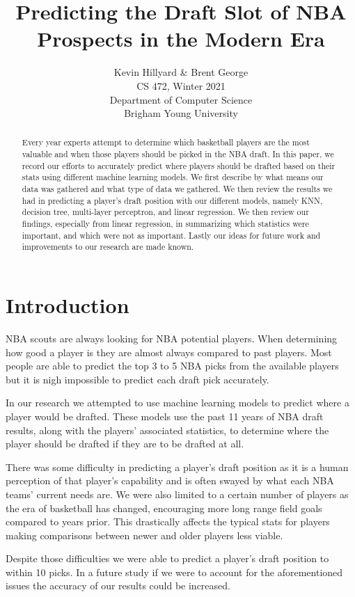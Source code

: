 \documentclass{article}
\title{Predicting the Draft Slot of NBA Prospects in the Modern Era}
\author{Kevin Hillyard \& Brent George \\
CS 472, Winter 2021 \\
Department of Computer Science\\
Brigham Young University}
\begin{document}
\maketitle

\begin{abstract}
  Every year experts attempt to determine which basketball players are the most
  valuable and when those players should be picked in the NBA draft. In this
  paper, we record our efforts to accurately predict where players should be
  drafted based on their stats using different machine learning models. We first
  describe by what means our data was gathered and what type of data we
  gathered. We then review the results we had in predicting a player’s draft
  position with our different models, namely KNN, decision tree, multi-layer
  perceptron, and linear regression. We then review our findings, especially
  from linear regression, in summarizing which statistics were important, and
  which were not as important. Lastly our ideas for future work and improvements
  to our research are made known.
\end{abstract}

\section{Introduction}

NBA scouts are always looking for NBA potential players. When determining how
good a player is they are almost always compared to past players. Most people
are able to predict the top 3 to 5 NBA picks from the available players but it
is nigh impossible to predict each draft pick accurately. 

In our research we attempted to use machine learning models to predict where a
player would be drafted. These models use the past 11 years of NBA draft
results, along with the players’ associated statistics, to determine where the
player should be drafted if they are to be drafted at all.

There was some difficulty in predicting a player’s draft position as it is a
human perception of that player’s capability and is often swayed by what each
NBA teams’ current needs are. We were also limited to a certain number of
players as the era of basketball has changed, encouraging more long range field
goals compared to years prior. This drastically affects the typical stats for
players making comparisons between newer and older players less viable.

Despite those difficulties we were able to predict a player’s draft position to
within 10 picks. In a future study if we were to account for the aforementioned
issues the accuracy of our results could be increased.
\end{document}

